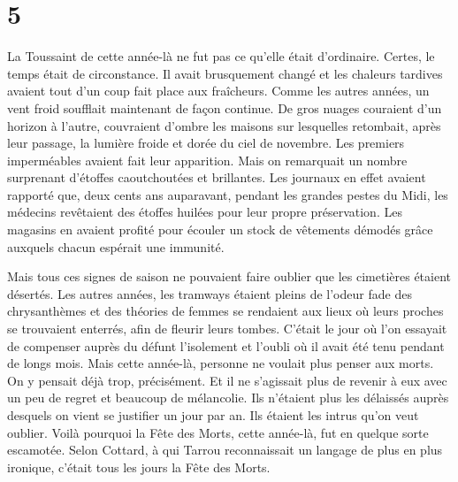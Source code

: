 \documentclass[french,twoside]{book} %
\begin{document}
\section[{5}]{5}
\noindent La Toussaint de cette année-là ne fut pas ce qu’elle était d’ordinaire. Certes, le temps était de circonstance. Il avait brusquement changé et les chaleurs tardives avaient tout d’un coup fait place aux fraîcheurs. Comme les autres années, un vent froid soufflait maintenant de façon continue. De gros nuages couraient d’un horizon à l’autre, couvraient d’ombre les maisons sur lesquelles retombait, après leur passage, la lumière froide et dorée du ciel de novembre. Les premiers imperméables avaient fait leur apparition. Mais on remarquait un nombre surprenant d’étoffes caoutchoutées et brillantes. Les journaux en effet avaient rapporté que, deux cents ans auparavant, pendant les grandes pestes du Midi, les médecins revêtaient des étoffes huilées pour leur propre préservation. Les magasins en avaient profité pour écouler un stock de vêtements démodés grâce auxquels chacun espérait une immunité.\par
Mais tous ces signes de saison ne pouvaient faire oublier que les cimetières étaient désertés. Les autres années, les tramways étaient pleins de l’odeur fade des chrysanthèmes et des théories de femmes se rendaient aux lieux où leurs proches se trouvaient enterrés, afin de fleurir leurs tombes. C’était le jour où l’on essayait de compenser auprès du défunt l’isolement et l’oubli où il avait été tenu pendant de longs mois. Mais cette année-là, personne ne voulait plus penser aux morts. On y pensait déjà trop, précisément. Et il ne s’agissait plus de revenir à eux avec un peu de regret et beaucoup de mélancolie. Ils n’étaient plus les délaissés auprès desquels on vient se justifier un jour par an. Ils étaient les intrus qu’on veut oublier. Voilà pourquoi la Fête des Morts, cette année-là, fut en quelque sorte escamotée. Selon Cottard, à qui Tarrou reconnaissait un langage de plus en plus ironique, c’était tous les jours la Fête des Morts.\par
\end{document}
